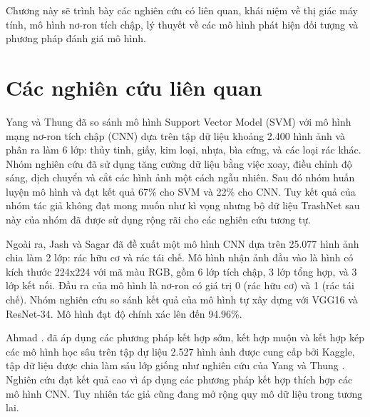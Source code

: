 \documentclass[../the.tex]{subfiles}
\begin{document}
{\fontsize{13}{12} \selectfont

Chương này sẽ trình bày các nghiên cứu có liên quan, khái niệm về thị giác máy tính, mô hình nơ-ron tích chập, lý thuyết về các mô hình phát hiện đối tượng và phương pháp đánh giá mô hình.

}

\section{Các nghiên cứu liên quan}
\label{sec:nnlq}
{\fontsize{13}{12} \selectfont

	Yang và Thung \cite{yang2016classification} đã so sánh mô hình Support Vector Model (SVM) với
	mô hình mạng nơ-ron tích chập (CNN) dựa trên tập dữ liệu khoảng 2.400 hình
	ảnh và phân ra làm 6 lớp: thủy tinh, giấy, kim loại, nhựa, bìa cứng, và các loại
	rác khác. Nhóm nghiên cứu đã sử dụng tăng cường dữ liệu bằng việc xoay, điều chỉnh độ sáng,
	dịch chuyển và cắt các hình ảnh một cách ngẫu nhiên. Sau đó nhóm huấn luyện mô hình và đạt kết quả 67\% cho SVM và 22\% cho CNN.
	Tuy kết quả của nhóm tác giả không đạt mong muốn như kì vọng nhưng bộ dữ liệu TrashNet sau này của nhóm đã được sử
	dụng rộng rãi cho các nghiên cứu tương tự.

}

\bigskip

{\fontsize{13}{12} \selectfont

	Ngoài ra, Jash và Sagar \cite{shah2022method} đã đề xuất một mô hình CNN dựa trên 25.077
	hình ảnh chia làm 2 lớp: rác hữu cơ và rác tái chế. Mô hình nhận ảnh đầu vào là
	hình có kích thước 224x224 với mã màu RGB, gồm 6 lớp tích chập, 3 lớp tổng
	hợp, và 3 lớp kết nối. Đầu ra của mô hình là nơ-ron
	có giá trị 0 (rác hữu cơ) và 1 (rác tái chế). Nhóm nghiên cứu so sánh kết quả
	của mô hình tự xây dựng với VGG16 \cite{simonyan2014very} và ResNet-34.
	Mô hình đạt độ chính xác lên đến 94.96\%.

}

\bigskip

{\fontsize{13}{12} \selectfont

	Ahmad \etal. \cite{ahmad2020intelligent} đã áp dụng các phương pháp kết hợp sớm, kết hợp muộn
	và kết hợp kép các mô hình học sâu trên tập dự liệu 2.527 hình ảnh được cung cấp bởi Kaggle, tập dữ liệu
	được chia làm sáu lớp giống như nghiên cứu của Yang và Thung \cite{yang2016classification}.
	Nghiên cứu đạt kết quả cao vì áp dụng các phương pháp kết hợp thích hợp các mô hình CNN.
	Tuy nhiên tác giả cũng đang mở rộng
	quy mô dữ liệu trong tương lai.

}
\end{document}
